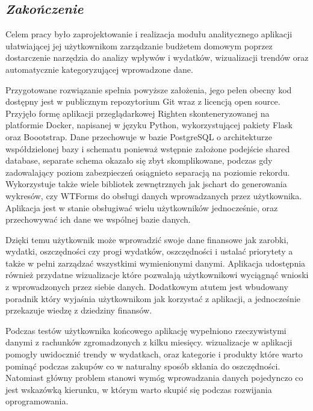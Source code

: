 \documentclass[a4paper, 10pt, twoside, openright]{report}
\newcommand{\customstylechapter}[1]{\large{\textit{#1}}}
\begin{document}
\begin{large}
\chapter{\customstylechapter{Zakończenie}}
{Celem pracy było zaprojektowanie i realizacja modułu analitycznego aplikacji 
ułatwiającej jej użytkownikom zarządzanie budżetem domowym poprzez dostarczenie
narzędzia do analizy wpływów i wydatków, wizualizacji trendów oraz automatycznie 
kategoryzującej wprowadzone dane.}

{Przygotowane rozwiązanie spełnia powyższe założenia, jego pełen obecny kod 
dostępny jest w publicznym repozytorium Git \cite{GITRighten} wraz z licencją 
open source. Przyjęło formę aplikacji przeglądarkowej Righten skonteneryzowanej 
na platformie Docker, napisanej w języku Python, wykorzystującej pakiety Flask 
oraz Boootstrap. Dane przechowuje w bazie PostgreSQL o architekturze 
współdzielonej bazy i schematu \cite{multitenant} ponieważ wstępnie założone 
podejście shared database, separate schema okazało się zbyt skomplikowane, 
podczas gdy zadowalający poziom zabezpieczeń osiągnieto separacją na poziomie 
rekordu. Wykorzystuje także wiele bibliotek zewnętrznych jak jschart do 
generowania wykresów, czy WTForms do obsługi danych wprowadzanych przez 
użytkownika. Aplikacja jest w stanie obsługiwać wielu użytkowników jednocześnie,
 oraz przechowywać ich dane we wspólnej bazie danych.}

{Dzięki temu użytkownik może wprowadzić swoje dane finansowe jak zarobki, 
wydatki, oszczędności czy progi wydatków, oszczędności i ustalać priorytety a 
także w pełni zarządzać wszystkimi wymienionymi danymi. Aplikacja udostępnia 
również przydatne wizualizacje które pozwalają użytkownikowi wyciągnąć wnioski 
z wprowadzonych przez siebie danych. Dodatkowym atutem jest wbudowany poradnik 
który wyjaśnia użytkownikom jak korzystać z aplikacji, a jednocześnie przekazuje
 wiedzę z dziedziny finansów.}

{Podczas testów użytkownika końcowego aplikację wypełniono rzeczywistymi danymi 
z rachunków zgromadzonych z kilku miesięcy. wizualizacje w aplikacji 
pomogły uwidocznić trendy w wydatkach, oraz kategorie i produkty które warto 
pominąć podczas zakupów co w naturalny sposób skłania do oszczędności. Natomiast
 główny problem stanowi wymóg wprowadzania danych pojedynczo co jest wskazówką 
kierunku, w którym warto skupić się podczas rozwijania oprogramowania.}


\end{large}
\end{document}
